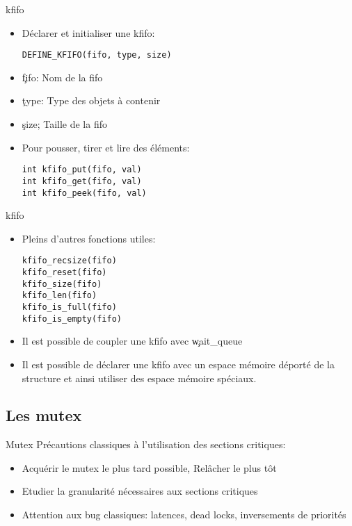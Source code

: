 \begin{frame}[fragile=singleslide]{kfifo}
  \begin{itemize}
  \item Déclarer et initialiser une kfifo:
    \begin{lstlisting}
DEFINE_KFIFO(fifo, type, size)
    \end{lstlisting}
  \item \c{fifo}: Nom de la fifo
  \item \c{type}: Type des objets à contenir
  \item \c{size}; Taille de la fifo
  \item Pour pousser, tirer et lire des éléments:
    \begin{lstlisting}
int kfifo_put(fifo, val)
int kfifo_get(fifo, val)
int kfifo_peek(fifo, val)
    \end{lstlisting}
  \end{itemize}
\end{frame}

\begin{frame}[fragile=singleslide]{kfifo}
  \begin{itemize}
  \item Pleins d'autres fonctions utiles:
    \begin{lstlisting}
kfifo_recsize(fifo)
kfifo_reset(fifo)
kfifo_size(fifo)
kfifo_len(fifo)
kfifo_is_full(fifo)
kfifo_is_empty(fifo)
    \end{lstlisting}
  \item Il est possible de coupler une kfifo avec \c{wait_queue}
  \item Il est  possible de déclarer une kfifo  avec un espace mémoire
    déporté  de la  structure  et ainsi  utiliser  des espace  mémoire
    spéciaux.
  \end{itemize}
\end{frame}

\subsection{Les mutex}

\begin{frame}{Mutex}
  Précautions classiques à l'utilisation des sections critiques:
  \begin{itemize}
  \item Acquérir le mutex le plus tard possible, Relâcher le plus tôt
  \item Etudier la granularité nécessaires aux sections critiques
  \item   Attention  aux   bug  classiques:   latences,   dead  locks,
    inversements de priorités
  \end{itemize}
\end{frame}

